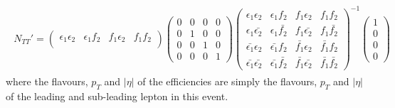 \begin{align}
\begin{split}
N_{TT}'
=
\left( \begin{array}{cccc}
\epsilon_1 \epsilon_2 & \epsilon_1 f_2 & f_1 \epsilon_2 & f_1 f_2 \\
\end{array} \right)
\left( \begin{array}{cccc}
0 & 0 & 0 & 0 \\
0 & 1 & 0 & 0 \\
0 & 0 & 1 & 0 \\
0 & 0 & 0 & 1
\end{array} \right)
\left( \begin{array}{cccc}
\epsilon_1 \epsilon_2 & \epsilon_1 f_2 & f_1 \epsilon_2 & f_1 f_2 \\
\epsilon_1 \bar{\epsilon_2} & \epsilon_1 \bar{f_2} & f_1 \bar{\epsilon_2} & f_1 \bar{f_2} \\
\bar{\epsilon_1} \epsilon_2 & \bar{\epsilon_1} f_2 & \bar{f_1} \epsilon_2 & \bar{f_1} f_2 \\
\bar{\epsilon_1} \bar{\epsilon_2} & \bar{\epsilon_1} \bar{f_2} & \bar{f_1} \bar{\epsilon_2} & \bar{f_1} \bar{f_2}
\end{array} \right)^{-1}
\left( \begin{array}{c}
1 \\
0 \\
0 \\
0
\end{array} \right)
\end{split}
\label{equ:fake_eff_fake_weight}
\end{align}
where the flavours, $p_T$ and $|\eta|$ of the efficiencies are simply the flavours, $p_T$ and $|\eta|$ of the leading and sub-leading lepton in this event.


